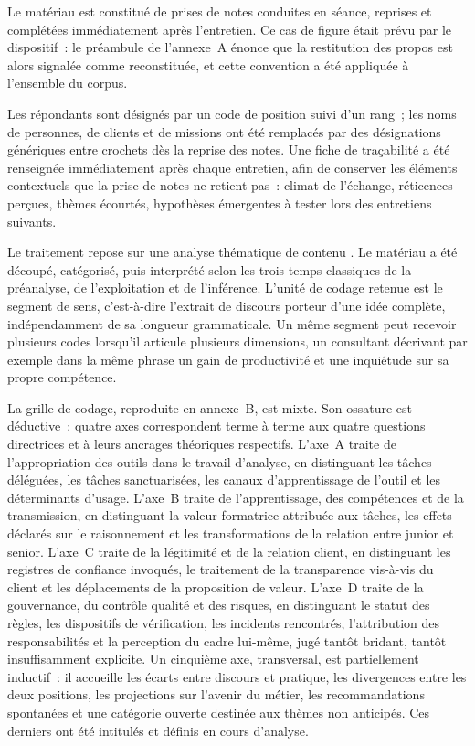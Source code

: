 Le matériau est constitué de prises de notes
conduites en séance, reprises et complétées immédiatement après l'entretien. Ce cas de
figure était prévu par le dispositif~: le préambule de l'annexe~A énonce que la
restitution des propos est alors signalée comme reconstituée, et cette convention a été
appliquée à l'ensemble du corpus.

Les répondants sont désignés par un code de position suivi d'un rang~; les noms de
personnes, de clients et de missions ont été remplacés par des désignations génériques
entre crochets dès la reprise des notes. Une fiche de traçabilité a été renseignée
immédiatement après chaque entretien, afin de conserver les éléments contextuels que la
prise de notes ne retient pas~: climat de l'échange, réticences perçues, thèmes
écourtés, hypothèses émergentes à tester lors des entretiens suivants.

Le traitement repose sur une analyse thématique de contenu \cite{bardin2001}. Le
matériau a été découpé, catégorisé, puis interprété selon les trois temps classiques de
la préanalyse, de l'exploitation et de l'inférence. L'unité de codage retenue est le
segment de sens, c'est-à-dire l'extrait de discours porteur d'une idée complète,
indépendamment de sa longueur grammaticale. Un même segment peut recevoir plusieurs
codes lorsqu'il articule plusieurs dimensions, un consultant décrivant par exemple dans
la même phrase un gain de productivité et une inquiétude sur sa propre compétence.

La grille de codage, reproduite en annexe~B, est mixte. Son ossature est déductive~:
quatre axes correspondent terme à terme aux quatre questions directrices et à leurs
ancrages théoriques respectifs. L'axe~A traite de l'appropriation des outils dans le
travail d'analyse, en distinguant les tâches déléguées, les tâches sanctuarisées, les
canaux d'apprentissage de l'outil et les déterminants d'usage. L'axe~B traite de
l'apprentissage, des compétences et de la transmission, en distinguant la valeur
formatrice attribuée aux tâches, les effets déclarés sur le raisonnement et les
transformations de la relation entre junior et senior. L'axe~C traite de la légitimité
et de la relation client, en distinguant les registres de confiance invoqués, le
traitement de la transparence vis-à-vis du client et les déplacements de la
proposition de valeur. L'axe~D traite de la gouvernance, du contrôle qualité et des
risques, en distinguant le statut des règles, les dispositifs de vérification, les
incidents rencontrés, l'attribution des responsabilités et la perception du cadre
lui-même, jugé tantôt bridant, tantôt insuffisamment explicite. Un cinquième axe,
transversal, est partiellement inductif~: il accueille les écarts entre discours et
pratique, les divergences entre les deux positions, les projections sur l'avenir du
métier, les recommandations spontanées et une catégorie ouverte destinée aux thèmes
non anticipés. Ces derniers ont été intitulés et définis en cours d'analyse.

